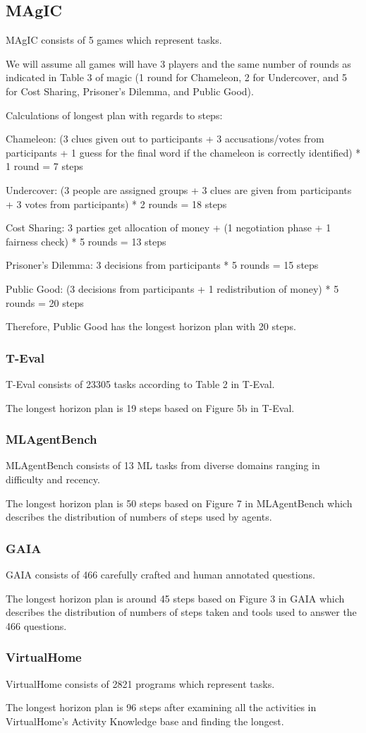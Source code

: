 \subsection{MAgIC}
MAgIC consists of 5 games which represent tasks.

We will assume all games will have 3 players and the same number of rounds as indicated in Table 3 of magic (1 round for Chameleon, 2 for Undercover, and 5 for Cost Sharing, Prisoner's Dilemma, and Public Good).

Calculations of longest plan with regards to steps:

Chameleon: (3 clues given out to participants + 3 accusations/votes from participants + 1 guess for the final word if the chameleon is correctly identified) * 1 round = 7 steps

Undercover: (3 people are assigned groups + 3 clues are given from participants + 3 votes from participants) * 2 rounds = 18 steps

Cost Sharing:  3 parties get allocation of money + (1 negotiation phase + 1 fairness check) * 5 rounds = 13 steps

Prisoner’s Dilemma: 3 decisions from participants * 5 rounds = 15 steps

Public Good: (3 decisions from participants + 1 redistribution of money) * 5 rounds = 20 steps

Therefore, Public Good has the longest horizon plan with 20 steps.

\subsubsection{T-Eval}
T-Eval consists of 23305 tasks according to Table 2 in T-Eval.

The longest horizon plan is 19 steps based on Figure 5b in T-Eval.

\subsubsection{MLAgentBench}
MLAgentBench consists of 13 ML tasks from diverse domains ranging in difficulty and recency.

The longest horizon plan is 50 steps based on Figure 7 in MLAgentBench which describes the distribution of numbers of steps used by agents.

\subsubsection{GAIA}
GAIA consists of 466 carefully crafted and human annotated questions.

The longest horizon plan is around 45 steps based on Figure 3 in GAIA which describes the distribution of numbers of steps taken and tools used to answer the 466 questions.

\subsubsection{VirtualHome}
VirtualHome consists of 2821 programs which represent tasks.

The longest horizon plan is 96 steps after examining all the activities in VirtualHome's Activity Knowledge base and finding the longest.